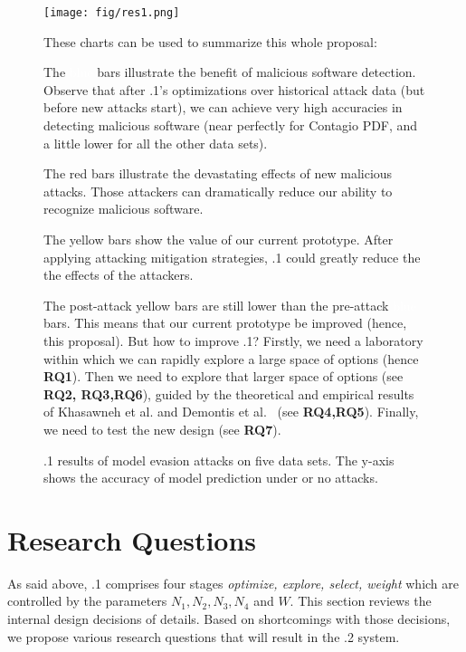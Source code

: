 \begin{figure} 
\caption{{\IT}.1 results of model evasion attacks on five data sets. The y-axis shows the accuracy of model prediction under or no attacks.}
\label{fig:all20}

\begin{center}
\texttt{[image: fig/res1.png]}
\end{center}


\begin{blockquote}
\noindent 
These charts can be used to summarize this whole proposal:
\bi
\item
The \colorbox{blue1}{\textcolor{white}{blue}} bars illustrate the benefit of malicious software detection.
Observe that after {\IT}.1's optimizations over historical attack data (but before new attacks start), we can achieve very high accuracies in detecting malicious software (near perfectly for Contagio PDF, and a little lower for all the other data sets). 
\item
The \colorbox{red1}{red} bars illustrate the devastating effects of new malicious attacks.
Those attackers can dramatically reduce our ability to recognize malicious software.
\item
The \colorbox{yellow1}{yellow} bars show the value of our current prototype.
After applying   attacking mitigation
strategies, {\IT}.1 could greatly reduce the the effects of the attackers.
\item
The post-attack \colorbox{yellow1}{yellow} bars are still  lower than the pre-attack   \colorbox{blue1}{\textcolor{white}{blue}}  bars.
This means that  our current prototype  
be  improved (hence, this proposal).
\ei
But how to improve {\IT}.1? Firstly, we need a laboratory within which we can rapidly explore a large space of options (hence {\bf RQ1}).
Then we need to explore that larger space of options (see {\bf RQ2, RQ3,RQ6}),
guided by the  theoretical and empirical results of
Khasawneh et al.\cite{khasawneh2017rhmd} and Demontis et al.~\cite{demontis2019adversarial} (see {\bf RQ4,RQ5}). Finally, we need
to test the new design (see {\bf RQ7}).
\end{blockquote}
\end{figure}
\newpage
\section{Research Questions}\label{rq}

As said above, {\IT}.1
comprises four stages {\em optimize, explore, select, weight}
which are controlled by the parameters $N_1,N_2,N_3,N_4$ and $W$. 
This section reviews  the internal design decisions of 
details. Based on shortcomings with those decisions, we propose various research questions that will result in the {\IT}.2
system.%

